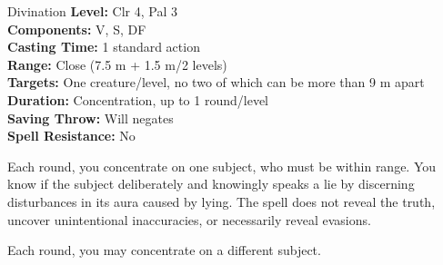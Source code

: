 {Divination}
{
	\textbf{Level:}
	Clr 4, Pal 3\\
	\textbf{Components:}
	V, S, DF\\
	\textbf{Casting Time:}
	1 standard action\\
	\textbf{Range:}
	Close (7.5 m + 1.5 m/2 levels)\\
	\textbf{Targets:}
	One creature/level, no two of which can be more than 9 m apart\\
	\textbf{Duration:}
	Concentration, up to 1 round/level\\
	\textbf{Saving Throw:}
	Will negates\\
	\textbf{Spell Resistance:}
	No\\
}
{
	Each round, you concentrate on one subject, who must be within range. You know if the subject deliberately and knowingly speaks a lie by discerning disturbances in its aura caused by lying. The spell does not reveal the truth, uncover unintentional inaccuracies, or necessarily reveal evasions.

	Each round, you may concentrate on a different subject.

}
